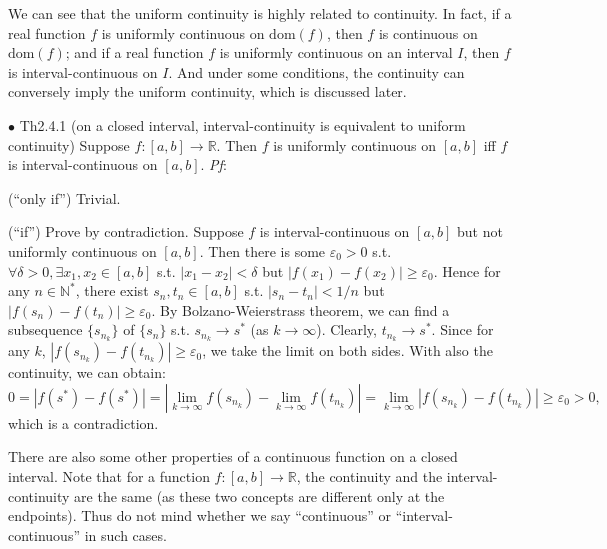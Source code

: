 \documentclass{article}
\begin{document}
\begin{Rmk}{}
    We can see that the uniform continuity is highly related to continuity. In fact, \textcolor{Th}{if a real function $f$ is uniformly continuous on $\text{dom}(f)$, then $f$ is continuous on $\text{dom}(f)$; and if a real function $f$ is uniformly continuous on an interval $I$, then $f$ is interval-continuous on $I$.} And under some conditions, the continuity can conversely imply the uniform continuity, which is discussed later.
\end{Rmk}

\begin{Th}{$\bullet$ Th2.4.1 (on a closed interval, interval-continuity is equivalent to uniform continuity)}
    Suppose $f:[a,b]\rightarrow\mathbb{R}$. Then $f$ is uniformly continuous on $[a,b]$ iff $f$ is interval-continuous on $[a,b]$.
    \tcblower
    \textit{Pf}: 
    \begin{compactenum}
        \item (``only if'') Trivial.
        \item (``if'') Prove by contradiction. Suppose $f$ is interval-continuous on $[a,b]$ but not uniformly continuous on $[a,b]$. Then there is some $\varepsilon_0>0$ s.t. $\forall\delta>0, \exists x_1, x_2\in[a,b]$ s.t. $|x_1-x_2|<\delta$ but $|f(x_1)-f(x_2)|\geq\varepsilon_0$. Hence for any $n\in\mathbb{N}^*$, there exist $s_n, t_n\in [a,b]$ s.t. $|s_n-t_n|<1/n$ but $|f(s_n)-f(t_n)|\geq \varepsilon_0$. By Bolzano-Weierstrass theorem, we can find a subsequence $\{s_{n_k}\}$ of $\{s_n\}$ s.t. $s_{n_k}\rightarrow s^*$ (as $k\rightarrow\infty$). Clearly, $t_{n_k}\rightarrow s^*$. Since for any $k$, $|f(s_{n_k})-f(t_{n_k})|\geq\varepsilon_0$, we take the limit on both sides. With also the continuity, we can obtain:
        $$0 = |f(s^*)-f(s^*)| = |\lim\limits_{k\to\infty} f(s_{n_k})-\lim\limits_{k\to\infty}f(t_{n_k})| = \lim\limits_{k\to\infty} |f(s_{n_k})-f(t_{n_k})|\geq \varepsilon_0 > 0,$$
        which is a contradiction.
    \end{compactenum}
\end{Th}

\begin{Rmk}{}
    There are also some other properties of a continuous function on a closed interval. Note that \textcolor{Th}{for a function $f:[a,b]\rightarrow \mathbb{R}$, the continuity and the interval-continuity are the same (as these two concepts are different only at the endpoints).} Thus do not mind whether we say ``continuous'' or ``interval-continuous'' in such cases.
\end{Rmk}
\end{document}
